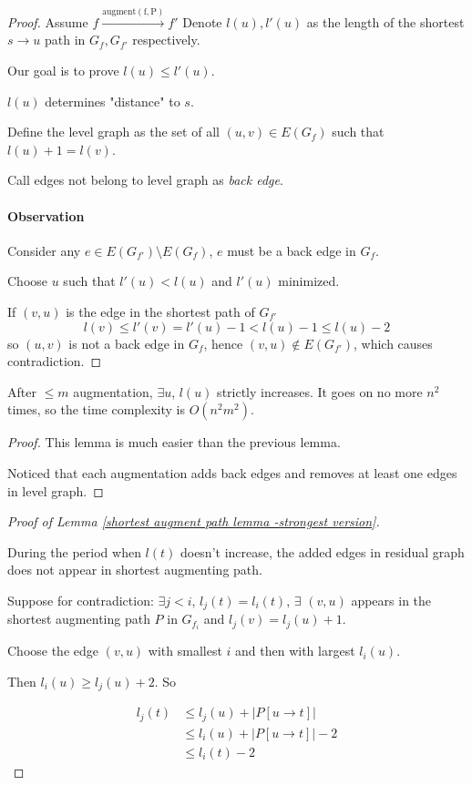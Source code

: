 \begin{proof}
    Assume $ f\xrightarrow{\mathrm{augment(f,P)}}f' $ 
    Denote  $ l(u), l'(u) $ as the length of the shortest  $ s\to u $ path in  $ G_f,G_{f'} $ respectively.
    
    Our goal is to  prove  $ l(u) \leq l'(u) $.

    $ l(u) $ determines "distance" to  $ s $. 
    
    Define the level graph as the set of  all  $ (u,v)\in E(G_f) $ such that  $ l(u)+1=l(v) $. 
    
    Call edges not belong to level graph as \textit{back edge}.

    \paragraph{Observation} Consider any  $ e\in E(G_{f'})\setminus E(G_f) $,  $ e $ must be a back edge in  $ G_f $.   

    Choose   $ u $ such that  $ l'(u)<l(u) $ and  $ l'(u) $ minimized.
    
    If  $ (v,u) $ is the edge in the shortest path of  $ G_{f'} $
    \[l(v) \leq l'(v)=l'(u)-1<l(u)-1 \leq l(u)-2\]
    so  $ (u,v) $ is not a back edge in  $ G_f $, hence  $ (v,u)\not\in E(G_{f'}) $, which causes contradiction.
\end{proof}

\begin{lemma}
    After  $  \leq m $ augmentation,  $ \exists u $,  $ l(u) $ strictly increases. It goes on no more $    n^2$     times, so the time complexity is  $ O(n^2m^2) $. 
\end{lemma}
\begin{proof}
    This lemma is much easier than the previous lemma. 

    Noticed that each augmentation adds back edges and removes at least one edges in level graph.
\end{proof}
\begin{proof}[Proof of Lemma \ref{shortest augment path lemma -strongest version}]
    \begin{claim}
        During the period when  $ l(t)  $ doesn't increase, the added edges in residual graph does not appear in shortest augmenting path.
    \end{claim}
    
    Suppose for contradiction:  $ \exists j<i $,  $ l_j(t)=l_i(t) $,  $ \exists  $  $ (v,u)  $ appears in the shortest augmenting path  $ P $ in  $ G_{f_i} $ and  $ l_j(v)=l_j(u)+1 $.
    
    Choose the edge  $ (v,u)  $ with smallest  $ i $ and then with largest  $ l_i(u) $.
    
    Then  $ l_i(u) \geq l_j(u)+2 $.
    So 

    \begin{align*}
        l_j(t)& \leq l_j(u)+|P[u\rightarrow t]|\\
        & \leq l_i(u)+|P[u\to t]|-2\\
        &\leq l_i(t)-2
    \end{align*}
    
\end{proof}

